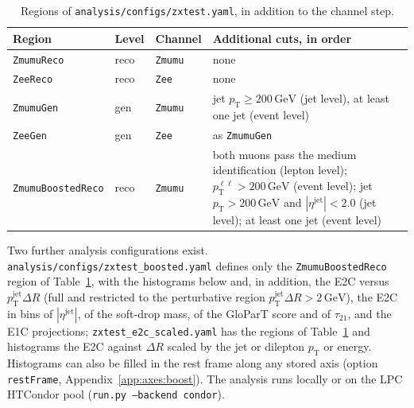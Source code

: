 \documentclass[11pt]{article}
\newcommand{\pt}{p_{\mathrm{T}}}
\newcommand{\GeV}{\ensuremath{\,\mathrm{GeV}}}
\newcommand{\ptll}{\pt^{\ell\ell}}
\newcommand{\ptj}{\pt^{\mathrm{jet}}}
\newcommand{\code}[1]{\texttt{#1}}
\begin{document}
\begin{table}[htbp]
\centering
\caption{Regions of \code{analysis/configs/zxtest.yaml}, in addition to the channel step.}
\label{tab:regions}
\small
\begin{tabularx}{\textwidth}{lll>{\raggedright\arraybackslash}X}
\toprule
Region & Level & Channel & Additional cuts, in order \\
\midrule
\code{ZmumuReco} & reco & \code{Zmumu} & none \\
\code{ZeeReco} & reco & \code{Zee} & none \\
\code{ZmumuGen} & gen & \code{Zmumu} & jet $\pt \geq 200\GeV$ (jet level), at least one jet (event level) \\
\code{ZeeGen} & gen & \code{Zee} & as \code{ZmumuGen} \\
\code{ZmumuBoostedReco} & reco & \code{Zmumu} & both muons pass the medium identification (lepton level);
  $\ptll > 200\GeV$ (event level); jet $\pt > 200\GeV$ and $|\eta^\mathrm{jet}| < 2.0$ (jet level); at least one jet
  (event level) \\
\bottomrule
\end{tabularx}
\end{table}

Two further analysis configurations exist. \code{analysis/configs/zxtest\_boosted.yaml} defines only the
\code{ZmumuBoostedReco} region of Table~\ref{tab:regions}, with the histograms below and, in addition, the E2C versus $\ptj\Delta R$ (full and
restricted to the perturbative region $\ptj\Delta R > 2\GeV$), the E2C in bins of $|\eta^\mathrm{jet}|$, of the
soft-drop mass, of the GloParT score and of $\tau_{21}$, and the E1C projections; \code{zxtest\_e2c\_scaled.yaml}
has the regions of Table~\ref{tab:regions} and histograms the E2C against $\Delta R$ scaled by the jet or dilepton $\pt$ or energy. Histograms can also be filled in
the rest frame along any stored axis (option \code{restFrame}, Appendix~\ref{app:axes:boost}). The analysis runs locally
or on the LPC HTCondor pool (\code{run.py --backend condor}).
\end{document}
